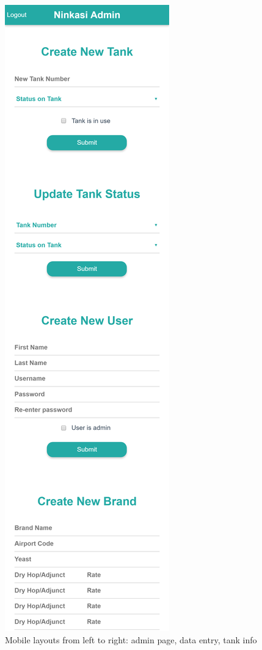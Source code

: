     \begin{figure}[H]
        \caption{Mobile layouts from left to right: admin page, data entry, tank info}
        \begin{multicols}{3}
            \includegraphics[width=\linewidth]{./img/mobile-admin-page.png}\par

\end{multicols}
\end{figure}
